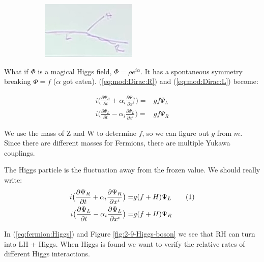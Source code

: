 \documentclass[]{article}
\newcommand\numberthis{\addtocounter{equation}{1}\tag{\theequation}}
\begin{document}
\begin{figure}[H]
\begin{subfigure}{0.3\textwidth}
 	\includegraphics[width=\textwidth]{2-9-Higgs-boson}
 \end{subfigure}
 \end{figure}

What if $\Phi$ is a magical Higgs field, $\Phi=\rho e^{i\alpha}$. It has a spontaneous symmetry breaking $\Phi=f$ ($\alpha$ got eaten). (\ref{eq:mod:Dirac:R}) and (\ref{eq:mod:Dirac:L}) become:

 \begin{align*}
i \big(\frac{\partial \Psi_R}{\partial t} + \alpha_i \frac{\partial \Psi_R}{\partial 	x^i}\big) =& g f \Psi_L \\
i \big(\frac{\partial \Psi_L}{\partial t} - \alpha_i \frac{\partial \Psi_L}{\partial 	x^i}\big) =& g f \Psi_R  
\end{align*}

We use the mass of Z and W to determine $f$, so we can figure out $g$ from $m$. Since there are different masses for Fermions, there are multiple Yukawa couplings.

The Higgs particle is the fluctuation away from the frozen value. We should really write:
 \begin{align*}
i \big(\frac{\partial \Psi_R}{\partial t} + \alpha_i \frac{\partial \Psi_R}{\partial 	x^i}\big) =& g (f+H) \Psi_L  \numberthis \label{eq:fermion:Higgs}\\
i \big(\frac{\partial \Psi_L}{\partial t} - \alpha_i \frac{\partial \Psi_L}{\partial 	x^i}\big) =& g (f+H) \Psi_R  
\end{align*}

In (\ref{eq:fermion:Higgs}) and Figure \ref{fig:2-9-Higgs-boson} we see that RH can turn into LH + Higgs. When Higgs is found we want to verify the relative rates of different Higgs interactions. 
\end{document}
